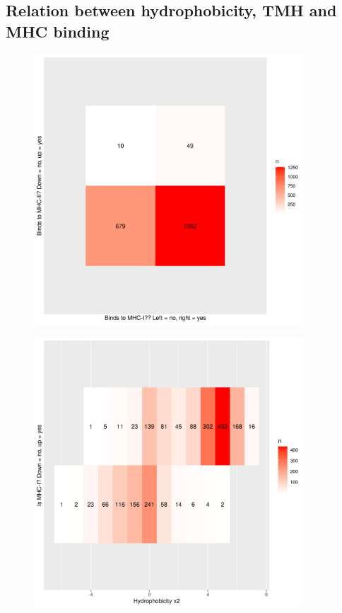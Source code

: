 \subsection{Relation between hydrophobicity, TMH and MHC binding}

\begin{figure}[!htbp]
  \includegraphics[width=0.9\textwidth]{p_bind_per_hydrophobicity/binds_mhc1_vs_binds_mhc2.png}
  \caption{
  }
  \label{fig:binds_mhc1_vs_binds_mhc2}
\end{figure}

\begin{figure}[!htbp]
  \includegraphics[width=0.9\textwidth]{p_bind_per_hydrophobicity/hydrophobicity_vs_binds_mhc1.png}
  \caption{
  }
  \label{fig:hydrophobicity_vs_binds_mhc1}
\end{figure}

